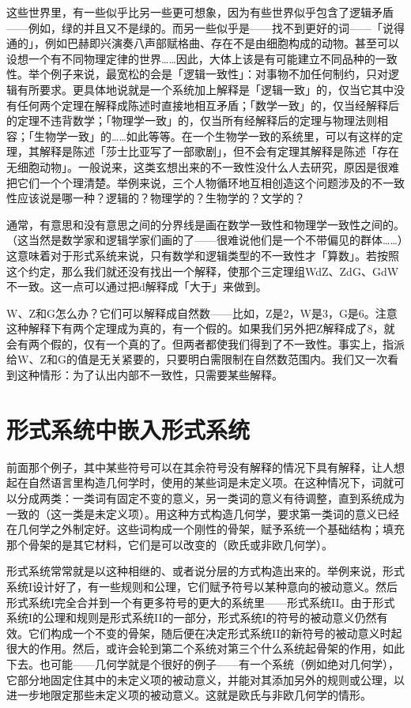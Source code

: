 \documentclass[
  12pt,
  twoside,
  openright,
  oldfontcommands,
]{memoir}
\begin{document}
这些世界里，有一些似乎比另一些更可想象，因为有些世界似乎包含了逻辑矛盾------例如，绿的并且又不是绿的。而另一些似乎是------找不到更好的词------「说得通的」，例如巴赫即兴演奏八声部赋格曲、存在不是由细胞构成的动物。甚至可以设想一个有不同物理定律的世界\ldots\ldots 因此，大体上该是有可能建立不同品种的一致性。举个例子来说，最宽松的会是「逻辑一致性」：对事物不加任何制约，只对逻辑有所要求。更具体地说就是一个系统加上解释是「逻辑一致」的，仅当它其中没有任何两个定理在解释成陈述时直接地相互矛盾；「数学一致」的，仅当经解释后的定理不违背数学；「物理学一致」的，仅当所有经解释后的定理与物理法则相容；「生物学一致」的\ldots\ldots 如此等等。在一个生物学一致的系统里，可以有这样的定理，其解释是陈述「莎士比亚写了一部歌剧」，但不会有定理其解释是陈述「存在无细胞动物」。一般说来，这类玄想出来的不一致性没什么人去研究，原因是很难把它们一个个理清楚。举例来说，三个人物循环地互相创造这个问题涉及的不一致性应该说是哪一种？逻辑的？物理学的？生物学的？文学的？

通常，有意思和没有意思之间的分界线是画在数学一致性和物理学一致性之间的。（这当然是数学家和逻辑学家们画的了------很难说他们是一个不带偏见的群体\ldots\ldots）这意味着对于形式系统来说，只有数学和逻辑类型的不一致性才「算数」。若按照这个约定，那么我们就还没有找出一个解释，使那个三定理组WdZ、ZdG、GdW不一致。这一点可以通过把d解释成「大于」来做到。

W、Z和G怎么办？它们可以解释成自然数------比如，Z是2，W是3，G是6。注意这种解释下有两个定理成为真的，有一个假的。如果我们另外把Z解释成了8，就会有两个假的，仅有一个真的了。但两者都使我们得到了不一致性。事实上，指派给W、Z和G的值是无关紧要的，只要明白需限制在自然数范围内。我们又一次看到这种情形：为了认出内部不一致性，只需要某些解释。

\section{形式系统中嵌入形式系统}

前面那个例子，其中某些符号可以在其余符号没有解释的情况下具有解释，让人想起在自然语言里构造几何学时，使用的某些词是未定义项。在这种情况下，词就可以分成两类：一类词有固定不变的意义，另一类词的意义有待调整，直到系统成为一致的（这一类是未定义项）。用这种方式构造几何学，要求第一类词的意义已经在几何学之外制定好。这些词构成一个刚性的骨架，赋予系统一个基础结构；填充那个骨架的是其它材料，它们是可以改变的（欧氏或非欧几何学）。

形式系统常常就是以这种相继的、或者说分层的方式构造出来的。举例来说，形式系统I设计好了，有一些规则和公理，它们赋予符号以某种意向的被动意义。然后形式系统I完全合并到一个有更多符号的更大的系统里------形式系统II。由于形式系统I的公理和规则是形式系统II的一部分，形式系统I的符号的被动意义仍然有效。它们构成一个不变的骨架，随后便在决定形式系统II的新符号的被动意义时起很大的作用。然后，或许会轮到第二个系统对第三个什么系统起骨架的作用，如此下去。也可能------几何学就是个很好的例子------有一个系统（例如绝对几何学），它部分地固定住其中的未定义项的被动意义，并能对其添加另外的规则或公理，以进一步地限定那些未定义项的被动意义。这就是欧氏与非欧几何学的情形。
\end{document}
